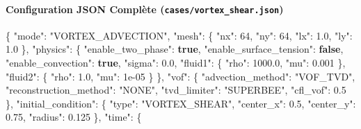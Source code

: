 \documentclass[
  10pt,
]{article}
\newenvironment{Shaded}{}{}
\newcommand{\DataTypeTok}[1]{\textcolor[rgb]{0.56,0.13,0.00}{#1}}
\newcommand{\DecValTok}[1]{\textcolor[rgb]{0.25,0.63,0.44}{#1}}
\newcommand{\FloatTok}[1]{\textcolor[rgb]{0.25,0.63,0.44}{#1}}
\newcommand{\FunctionTok}[1]{\textcolor[rgb]{0.02,0.16,0.49}{#1}}
\newcommand{\KeywordTok}[1]{\textcolor[rgb]{0.00,0.44,0.13}{\textbf{#1}}}
\newcommand{\StringTok}[1]{\textcolor[rgb]{0.25,0.44,0.63}{#1}}
\begin{document}
\paragraph{\texorpdfstring{Configuration JSON Complète
(\texttt{cases/vortex\_shear.json})}{Configuration JSON Complète (cases/vortex\_shear.json)}}\label{configuration-json-compluxe8te-casesvortex_shear.json}

\begin{Shaded}
\begin{Highlighting}[]
\FunctionTok{\{}
  \DataTypeTok{"mode"}\FunctionTok{:} \StringTok{"VORTEX\_ADVECTION"}\FunctionTok{,}
  \DataTypeTok{"mesh"}\FunctionTok{:} \FunctionTok{\{}
    \DataTypeTok{"nx"}\FunctionTok{:} \DecValTok{64}\FunctionTok{,}
    \DataTypeTok{"ny"}\FunctionTok{:} \DecValTok{64}\FunctionTok{,}
    \DataTypeTok{"lx"}\FunctionTok{:} \FloatTok{1.0}\FunctionTok{,}
    \DataTypeTok{"ly"}\FunctionTok{:} \FloatTok{1.0}
  \FunctionTok{\},}
  \DataTypeTok{"physics"}\FunctionTok{:} \FunctionTok{\{}
    \DataTypeTok{"enable\_two\_phase"}\FunctionTok{:} \KeywordTok{true}\FunctionTok{,}
    \DataTypeTok{"enable\_surface\_tension"}\FunctionTok{:} \KeywordTok{false}\FunctionTok{,}
    \DataTypeTok{"enable\_convection"}\FunctionTok{:} \KeywordTok{true}\FunctionTok{,}
    \DataTypeTok{"sigma"}\FunctionTok{:} \FloatTok{0.0}\FunctionTok{,}
    \DataTypeTok{"fluid1"}\FunctionTok{:} \FunctionTok{\{}
      \DataTypeTok{"rho"}\FunctionTok{:} \FloatTok{1000.0}\FunctionTok{,}
      \DataTypeTok{"mu"}\FunctionTok{:} \FloatTok{0.001}
    \FunctionTok{\},}
    \DataTypeTok{"fluid2"}\FunctionTok{:} \FunctionTok{\{}
      \DataTypeTok{"rho"}\FunctionTok{:} \FloatTok{1.0}\FunctionTok{,}
      \DataTypeTok{"mu"}\FunctionTok{:} \DecValTok{1e{-}05}
    \FunctionTok{\}}
  \FunctionTok{\},}
  \DataTypeTok{"vof"}\FunctionTok{:} \FunctionTok{\{}
    \DataTypeTok{"advection\_method"}\FunctionTok{:} \StringTok{"VOF\_TVD"}\FunctionTok{,}
    \DataTypeTok{"reconstruction\_method"}\FunctionTok{:} \StringTok{"NONE"}\FunctionTok{,}
    \DataTypeTok{"tvd\_limiter"}\FunctionTok{:} \StringTok{"SUPERBEE"}\FunctionTok{,}
    \DataTypeTok{"cfl\_vof"}\FunctionTok{:} \FloatTok{0.5}
  \FunctionTok{\},}
  \DataTypeTok{"initial\_condition"}\FunctionTok{:} \FunctionTok{\{}
    \DataTypeTok{"type"}\FunctionTok{:} \StringTok{"VORTEX\_SHEAR"}\FunctionTok{,}
    \DataTypeTok{"center\_x"}\FunctionTok{:} \FloatTok{0.5}\FunctionTok{,}
    \DataTypeTok{"center\_y"}\FunctionTok{:} \FloatTok{0.75}\FunctionTok{,}
    \DataTypeTok{"radius"}\FunctionTok{:} \FloatTok{0.125}
  \FunctionTok{\},}
  \DataTypeTok{"time"}\FunctionTok{:} \FunctionTok{\{}

\end{Highlighting}
\end{Shaded}
\end{document}
